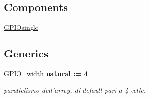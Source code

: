 \subsection*{Components}
 \begin{DoxyCompactItemize}
\item 
\hypertarget{group___g_p_i_o-array_ga1ef3f8a153dc3cf7c70b202d716ca7af}{\hyperlink{group___g_p_i_o-array_ga1ef3f8a153dc3cf7c70b202d716ca7af}{G\+P\+I\+Osingle}  {\bfseries }  }\label{group___g_p_i_o-array_ga1ef3f8a153dc3cf7c70b202d716ca7af}

\end{DoxyCompactItemize}
\subsection*{Generics}
 \begin{DoxyCompactItemize}
\item 
\hypertarget{group___g_p_i_o-array_ga0b52ca75e9a6093b2b60d5e851803069}{\hyperlink{group___g_p_i_o-array_ga0b52ca75e9a6093b2b60d5e851803069}{G\+P\+I\+O\+\_\+width} {\bfseries {\bfseries \textcolor{vhdlchar}{natural}\textcolor{vhdlchar}{ }\textcolor{vhdlchar}{ }\textcolor{vhdlchar}{\+:}\textcolor{vhdlchar}{=}\textcolor{vhdlchar}{ }\textcolor{vhdlchar}{ } \textcolor{vhdldigit}{4} \textcolor{vhdlchar}{ }}}}\label{group___g_p_i_o-array_ga0b52ca75e9a6093b2b60d5e851803069}

\begin{DoxyCompactList}\small\item\em parallelismo dell'array, di default pari a 4 celle. \end{DoxyCompactList}\end{DoxyCompactItemize}
